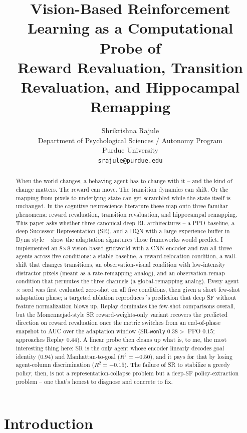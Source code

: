 \documentclass{article}
\title{Vision-Based Reinforcement Learning as a Computational Probe of\\
Reward Revaluation, Transition Revaluation, and Hippocampal Remapping}
\author{%
  Shrikrishna Rajule\\
  Department of Psychological Sciences / Autonomy Program\\
  Purdue University\\
  \texttt{srajule@purdue.edu}\\
}
\begin{document}
\maketitle

\begin{abstract}
When the world changes, a behaving agent has to change with it -- and the kind of change matters. The reward can move. The transition dynamics can shift. Or the mapping from pixels to underlying state can get scrambled while the state itself is unchanged. In the cognitive-neuroscience literature these map onto three familiar phenomena: reward revaluation, transition revaluation, and hippocampal remapping. This paper asks whether three canonical deep RL architectures -- a PPO baseline, a deep Successor Representation (SR), and a DQN with a large experience buffer in Dyna style -- show the adaptation signatures those frameworks would predict. I implemented an 8$\times$8 vision-based gridworld with a CNN encoder and ran all three agents across five conditions: a stable baseline, a reward-relocation condition, a wall-shift that changes transitions, an observation-visual condition with low-intensity distractor pixels (meant as a rate-remapping analog), and an observation-remap condition that permutes the three channels (a global-remapping analog). Every agent $\times$ seed was first evaluated zero-shot on all five conditions, then given a short few-shot adaptation phase; a targeted ablation reproduces \citet{lehnert2024sf}'s prediction that deep SF without feature normalization blows up. Replay dominates the few-shot comparisons overall, but the Momennejad-style SR reward-weights-only variant recovers the predicted direction on reward revaluation once the metric switches from an end-of-phase snapshot to AUC over the adaptation window (SR-\texttt{wonly} $0.38>$ PPO $0.15$; approaches Replay $0.44$). A linear probe then cleans up what is, to me, the most interesting thing here: SR is the only agent whose encoder linearly decodes goal identity ($0.94$) and Manhattan-to-goal ($R^2{=}{+}0.50$), and it pays for that by losing agent-column discrimination ($R^2{=}{-}0.15$). The failure of SR to stabilize a greedy policy, then, is not a representation-collapse problem but a deep-SF policy-extraction problem -- one that's honest to diagnose and concrete to fix.
\end{abstract}

\section{Introduction}
\label{sec:intro}
\end{document}
